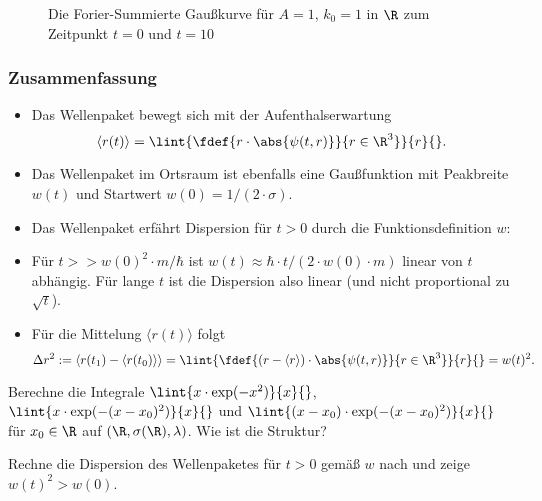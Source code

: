 \documentclass{subfiles}
\begin{document}
        \begin{figure}[H]
            \centering
            \caption{Die Forier-Summierte Gaußkurve für $A=1$, $k_0=1$ in $\R$ zum Zeitpunkt $t=0$ und $t=10$}
        \end{figure}

        \subsubsection*{Zusammenfassung}
            \begin{itemize}[label=$\to$]
                \item Das Wellenpaket bewegt sich mit der Aufenthalserwartung 
                \[\langle r(t)\rangle = \lint{\fdef{r\cdot\abs{\psi(t,r)}}{r\in\R^3}}{r}{}.\]
                \item Das Wellenpaket im Ortsraum ist ebenfalls eine Gaußfunktion mit Peakbreite $w(t)$ und Startwert $w(0) = 1/(2\cdot\sigma)$. 
                \item Das Wellenpaket erfährt Dispersion für $t>0$ durch die Funktionsdefinition $w$:
                \item Für $t>> w(0)^2\cdot m/\hbar$ ist $w(t) \approx \hbar\cdot t/(2\cdot w(0)\cdot m)$ linear von $t$ abhängig. Für lange $t$ ist die Dispersion also linear (und nicht proportional zu $\sqrt{t}$). 
                \item Für die Mittelung $\langle r(t)\rangle$ folgt 
                \[\Delta r^2 := \langle r(t_1) - \langle r(t_0)\rangle\rangle = \lint{\fdef{(r-\langle r\rangle)\cdot\abs{\psi(t,r)}}{r\in\R^3}}{r}{} = w(t)^2.\]
            \end{itemize}
            \begin{Aufgabe}
                 Berechne die Integrale $\lint{x\cdot\exp(-x^2)}{x}{}$, $\lint{x\cdot\exp(-(x-x_0)^2)}{x}{}$ und $\lint{(x-x_0)\cdot\exp(-(x-x_0)^2)}{x}{}$ für $x_0\in\R$ auf $(\R,\sigma(\R),\lambda)$. Wie ist die Struktur?
    
                \nr{} Rechne die Dispersion des Wellenpaketes für $t>0$ gemäß $w$ nach und zeige $w(t)^2>w(0)$. 
            \end{Aufgabe}
\end{document}
